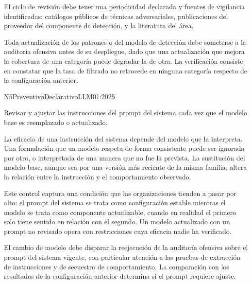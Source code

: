 El ciclo de revisión debe tener una periodicidad declarada y fuentes de vigilancia identificadas: catálogos públicos de técnicas adversariales, publicaciones del proveedor del componente de detección, y la literatura del área.

Toda actualización de los patrones o del modelo de detección debe someterse a la auditoría ofensiva antes de su despliegue, dado que una actualización que mejora la cobertura de una categoría puede degradar la de otra. La verificación consiste en constatar que la tasa de filtrado no retrocede en ninguna categoría respecto de la configuración anterior.


  {N5}{Preventivo}{Declarativo}{LLM01:2025}

Revisar y ajustar las instrucciones del prompt del sistema cada vez que el modelo base es reemplazado o actualizado.

La eficacia de una instrucción del sistema depende del modelo que la interpreta. Una formulación que un modelo respeta de forma consistente puede ser ignorada por otro, o interpretada de una manera que no fue la prevista. La sustitución del modelo base, aunque sea por una versión más reciente de la misma familia, altera la relación entre la instrucción y el comportamiento observado.

Este control captura una condición que las organizaciones tienden a pasar por alto: el prompt del sistema se trata como configuración estable mientras el modelo se trata como componente actualizable, cuando en realidad el primero solo tiene sentido en relación con el segundo. Un modelo actualizado con un prompt no revisado opera con restricciones cuya eficacia nadie ha verificado.

El cambio de modelo debe disparar la reejecución de la auditoría ofensiva sobre el prompt del sistema vigente, con particular atención a las pruebas de extracción de instrucciones y de secuestro de comportamiento. La comparación con los resultados de la configuración anterior determina si el prompt requiere ajuste.

